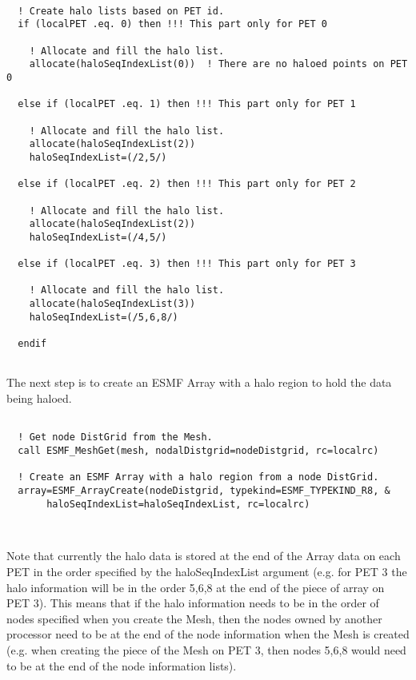 
 \begin{verbatim}

  ! Create halo lists based on PET id.
  if (localPET .eq. 0) then !!! This part only for PET 0

    ! Allocate and fill the halo list.
    allocate(haloSeqIndexList(0))  ! There are no haloed points on PET 0

  else if (localPET .eq. 1) then !!! This part only for PET 1

    ! Allocate and fill the halo list.
    allocate(haloSeqIndexList(2)) 
    haloSeqIndexList=(/2,5/)

  else if (localPET .eq. 2) then !!! This part only for PET 2

    ! Allocate and fill the halo list.
    allocate(haloSeqIndexList(2)) 
    haloSeqIndexList=(/4,5/)

  else if (localPET .eq. 3) then !!! This part only for PET 3

    ! Allocate and fill the halo list.
    allocate(haloSeqIndexList(3)) 
    haloSeqIndexList=(/5,6,8/)

  endif
 
\end{verbatim}
 

  
   The next step is to create an ESMF Array with a halo region to hold the data being haloed. 
   

 \begin{verbatim}

  ! Get node DistGrid from the Mesh. 
  call ESMF_MeshGet(mesh, nodalDistgrid=nodeDistgrid, rc=localrc)

  ! Create an ESMF Array with a halo region from a node DistGrid.
  array=ESMF_ArrayCreate(nodeDistgrid, typekind=ESMF_TYPEKIND_R8, &
       haloSeqIndexList=haloSeqIndexList, rc=localrc)

 
\end{verbatim}
 

  
   Note that currently the halo data is stored at the end of the Array data on each PET in the order specified
   by the haloSeqIndexList argument (e.g. for PET 3 the halo information will be in the order 5,6,8 
   at the end of the piece of array on PET 3). This means that if the halo information needs to be in the order of    
   nodes specified when you create the Mesh, then the nodes owned by another processor need to 
   be at the end of the node information when the Mesh is created (e.g. when creating
   the piece of the Mesh on PET 3, then nodes 5,6,8 would need to be at the end of the node information lists).
  
